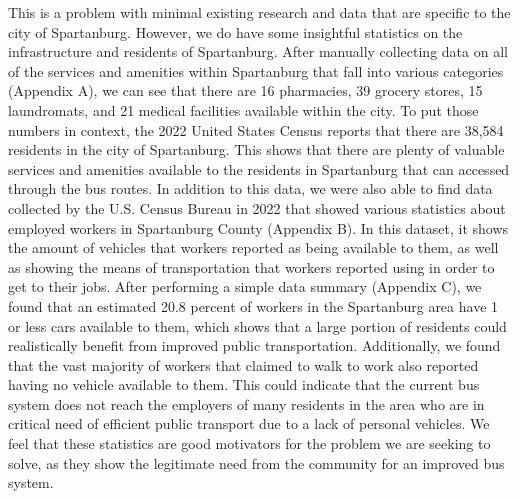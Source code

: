 This is a problem with minimal existing research and data that are specific to the city of Spartanburg. However, we do have some insightful statistics on the infrastructure and residents of Spartanburg. After manually collecting data on all of the services and amenities within Spartanburg that fall into various categories (Appendix A), we can see that there are 16 pharmacies, 39 grocery stores, 15 laundromats, and 21 medical facilities available within the city. To put those numbers in context, the 2022 United States Census reports that there are 38,584 residents in the city of Spartanburg. This shows that there are plenty of valuable services and amenities available to the residents in Spartanburg that can accessed through the bus routes.
\linebreak
\linebreak
In addition to this data, we were also able to find data collected by the U.S. Census Bureau in 2022 that showed various statistics about employed workers in Spartanburg County (Appendix B). In this dataset, it shows the amount of vehicles that workers reported as being available to them, as well as showing the means of transportation that workers reported using in order to get to their jobs. After performing a simple data summary (Appendix C), we found that an estimated 20.8 percent of workers in the Spartanburg area have 1 or less cars available to them, which shows that a large portion of residents could realistically benefit from improved public transportation. Additionally, we found that the vast majority of workers that claimed to walk to work also reported having no vehicle available to them. This could indicate that the current bus system does not reach the employers of many residents in the area who are in critical need of efficient public transport due to a lack of personal vehicles. We feel that these statistics are good motivators for the problem we are seeking to solve, as they show the legitimate need from the community for an improved bus system.

